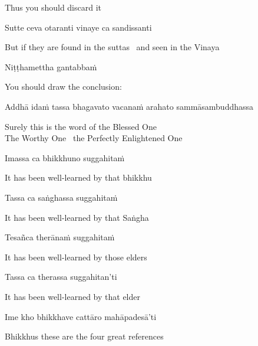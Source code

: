 \begin{english}
  Thus you should discard it
\end{english}

Sutte ceva otaranti vinaye ca sandissanti

\begin{english}
  But if they are found in the suttas \breathmark\ and seen in the Vinaya
\end{english}

Niṭṭhamettha gantabbaṁ

\begin{english}
  You should draw the conclusion:
\end{english}

Addhā idaṁ tassa bhagavato vacanaṁ arahato sammāsambuddhassa

\begin{english}
  Surely this is the word of the Blessed One\\
  The Worthy One \breathmark\ the Perfectly Enlightened One
\end{english}

Imassa ca bhikkhuno suggahitaṁ

\begin{english}
  It has been well-learned by that bhikkhu
\end{english}

Tassa ca saṅghassa suggahitaṁ

\begin{english}
  It has been well-learned by that Saṅgha
\end{english}

Tesañca therānaṁ suggahitaṁ

\begin{english}
  It has been well-learned by those elders
\end{english}

Tassa ca therassa suggahitan’ti

\begin{english}
  It has been well-learned by that elder
\end{english}

Ime kho bhikkhave cattāro mahāpadesā’ti

\begin{english}
  Bhikkhus these are the four great references
\end{english}

\suttaRef{[AN 4.180]}


